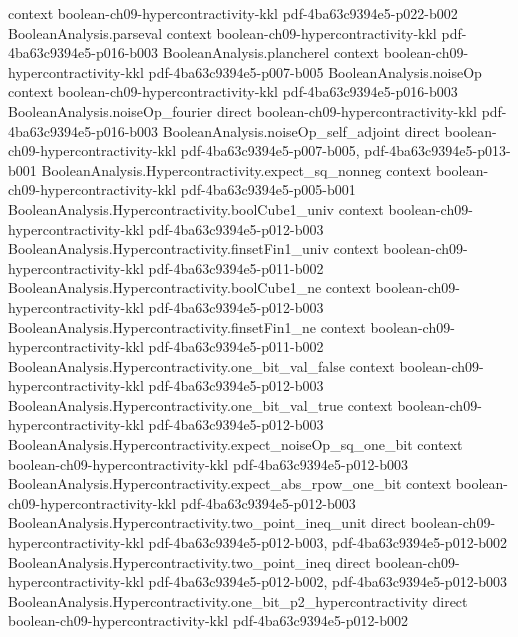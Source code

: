 \begin{theorem}
  {context}
  {boolean-ch09-hypercontractivity-kkl}
  {pdf-4ba63c9394e5-p022-b002}
\proofstep
  {BooleanAnalysis.parseval}
  {context}
  {boolean-ch09-hypercontractivity-kkl}
  {pdf-4ba63c9394e5-p016-b003}
\proofstep
  {BooleanAnalysis.plancherel}
  {context}
  {boolean-ch09-hypercontractivity-kkl}
  {pdf-4ba63c9394e5-p007-b005}
\proofstep
  {BooleanAnalysis.noiseOp}
  {context}
  {boolean-ch09-hypercontractivity-kkl}
  {pdf-4ba63c9394e5-p016-b003}
\proofstep
  {BooleanAnalysis.noiseOp_fourier}
  {direct}
  {boolean-ch09-hypercontractivity-kkl}
  {pdf-4ba63c9394e5-p016-b003}
\proofstep
  {BooleanAnalysis.noiseOp_self_adjoint}
  {direct}
  {boolean-ch09-hypercontractivity-kkl}
  {pdf-4ba63c9394e5-p007-b005,
    pdf-4ba63c9394e5-p013-b001}
\proofstep
  {BooleanAnalysis.Hypercontractivity.expect_sq_nonneg}
  {context}
  {boolean-ch09-hypercontractivity-kkl}
  {pdf-4ba63c9394e5-p005-b001}
\proofstep
  {BooleanAnalysis.Hypercontractivity.boolCube1_univ}
  {context}
  {boolean-ch09-hypercontractivity-kkl}
  {pdf-4ba63c9394e5-p012-b003}
\proofstep
  {BooleanAnalysis.Hypercontractivity.finsetFin1_univ}
  {context}
  {boolean-ch09-hypercontractivity-kkl}
  {pdf-4ba63c9394e5-p011-b002}
\proofstep
  {BooleanAnalysis.Hypercontractivity.boolCube1_ne}
  {context}
  {boolean-ch09-hypercontractivity-kkl}
  {pdf-4ba63c9394e5-p012-b003}
\proofstep
  {BooleanAnalysis.Hypercontractivity.finsetFin1_ne}
  {context}
  {boolean-ch09-hypercontractivity-kkl}
  {pdf-4ba63c9394e5-p011-b002}
\proofstep
  {BooleanAnalysis.Hypercontractivity.one_bit_val_false}
  {context}
  {boolean-ch09-hypercontractivity-kkl}
  {pdf-4ba63c9394e5-p012-b003}
\proofstep
  {BooleanAnalysis.Hypercontractivity.one_bit_val_true}
  {context}
  {boolean-ch09-hypercontractivity-kkl}
  {pdf-4ba63c9394e5-p012-b003}
\proofstep
  {BooleanAnalysis.Hypercontractivity.expect_noiseOp_sq_one_bit}
  {context}
  {boolean-ch09-hypercontractivity-kkl}
  {pdf-4ba63c9394e5-p012-b003}
\proofstep
  {BooleanAnalysis.Hypercontractivity.expect_abs_rpow_one_bit}
  {context}
  {boolean-ch09-hypercontractivity-kkl}
  {pdf-4ba63c9394e5-p012-b003}
\proofstep
  {BooleanAnalysis.Hypercontractivity.two_point_ineq_unit}
  {direct}
  {boolean-ch09-hypercontractivity-kkl}
  {pdf-4ba63c9394e5-p012-b003,
    pdf-4ba63c9394e5-p012-b002}
\proofstep
  {BooleanAnalysis.Hypercontractivity.two_point_ineq}
  {direct}
  {boolean-ch09-hypercontractivity-kkl}
  {pdf-4ba63c9394e5-p012-b002,
    pdf-4ba63c9394e5-p012-b003}
\proofstep
  {BooleanAnalysis.Hypercontractivity.one_bit_p2_hypercontractivity}
  {direct}
  {boolean-ch09-hypercontractivity-kkl}
  {pdf-4ba63c9394e5-p012-b002}

\end{theorem}
